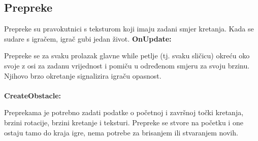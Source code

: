 \documentclass{mathos}
\begin{document}
\subsection{Prepreke}
Prepreke su pravokutnici s teksturom koji imaju zadani smjer kretanja. Kada se sudare s igračem, igrač gubi jedan život.
\textbf{OnUpdate: }

Prepreke se za svaku prolazak glavne while petlje (tj. svaku sličicu) okreću oko svoje z osi za zadanu vrijednost i pomiču u određenom smjeru za svoju brzinu.
Njihovo brzo okretanje signalizira igraču opasnost.
\\ \\
\textbf{CreateObstacle: }

Preprekama je potrebno zadati podatke o početnoj i završnoj točki kretanja, brzini rotacije, brzini kretanje i teksturi. Prepreke se stvore na početku i one
ostaju tamo do kraja igre, nema potrebe za brisanjem ili stvaranjem novih.
\end{document}
